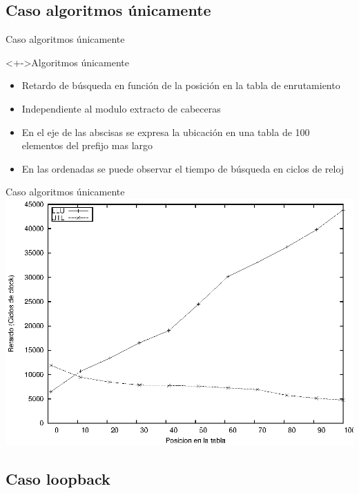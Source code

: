 \documentclass[xcolor=dvipsnames]{beamer}
\begin{document}
\subsection{Caso algoritmos únicamente}
\begin{frame}{Caso algoritmos únicamente}
\begin{block}<+->{Algoritmos únicamente}   
    \begin{itemize}
      \scriptsize
     	\item Retardo de búsqueda en función de la posición en la tabla de enrutamiento
     	\item Independiente al modulo extracto de cabeceras
	\item En el eje de las abscisas se expresa la ubicación en una tabla de 100 elementos del prefijo mas largo
	\item En las ordenadas se puede observar el tiempo de búsqueda en ciclos de reloj
    \end{itemize}
  \end{block}
\end{frame}

\begin{frame}{Caso algoritmos únicamente} 
\center	
\includegraphics[scale=0.70]{figures/llu-utlsof.eps} 
\end{frame}

\subsection{Caso loopback}
\end{document}
